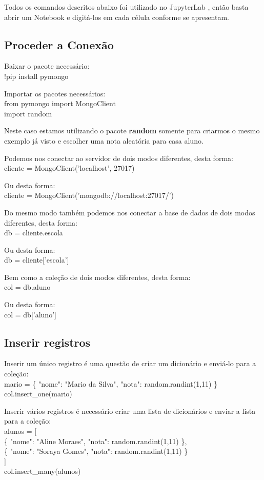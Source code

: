 \documentclass[a4paper,11pt]{article}
\begin{document}
Todos os comandos descritos abaixo foi utilizado no JupyterLab \cite{jupyteroficial}, então basta abrir um Notebook e digitá-los em cada célula conforme se apresentam.

\subsection{Proceder a Conexão}
Baixar o pacote necessário: \\
{\ttfamily !pip install pymongo}

Importar os pacotes necessários: \\
{\ttfamily from pymongo import MongoClient \\
	import random}

Neste caso estamos utilizando o pacote \textbf{random} somente para criarmos o mesmo exemplo já visto e escolher uma nota aleatória para casa aluno.

Podemos nos conectar ao servidor de dois modos diferentes, desta forma: \\
{\ttfamily cliente = MongoClient('localhost', 27017)}

Ou desta forma: \\
{\ttfamily cliente = MongoClient('mongodb://localhost:27017/')}

Do mesmo modo também podemos nos conectar a base de dados de dois modos diferentes, desta forma: \\
{\ttfamily db = cliente.escola}

Ou desta forma: \\
{\ttfamily db = cliente['escola']}

Bem como a coleção de dois modos diferentes, desta forma: \\
{\ttfamily col = db.aluno}

Ou desta forma: \\
{\ttfamily col = db['aluno']}

\subsection{Inserir registros}
Inserir um único registro é uma questão de criar um dicionário e enviá-lo para a coleção: \\
{\ttfamily mario = \{ "nome": "Mario da Silva", "nota": random.randint(1,11) \} \\
col.insert\_one(mario) }

Inserir vários registros é necessário criar uma lista de dicionários e enviar a lista para a coleção: \\
{\ttfamily alunos = [ \\
\phantom{x}\hspace{4pt} \{ "nome": "Aline Moraes", "nota": random.randint(1,11) \}, \\
\phantom{x}\hspace{4pt} \{ "nome": "Soraya Gomes", "nota": random.randint(1,11) \} \\
] \\
col.insert\_many(alunos)
}
\end{document}
